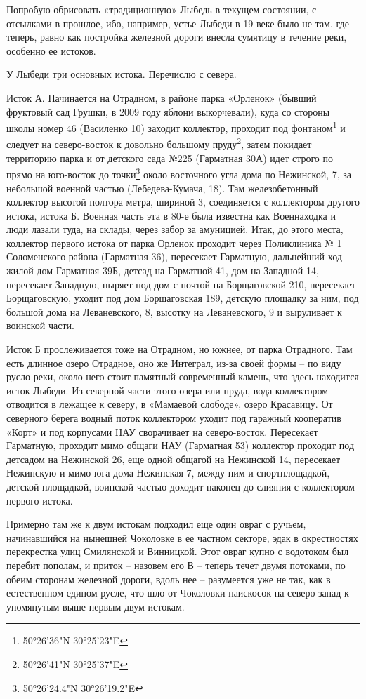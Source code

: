 Попробую обрисовать «традиционную» Лыбедь в текущем состоянии, с отсылками в прошлое, ибо, например, устье Лыбеди в 19 веке было не там, где теперь, равно как постройка железной дороги внесла сумятицу в течение реки, особенно ее истоков.

У Лыбеди три основных истока. Перечислю с севера.

Исток А. Начинается на Отрадном, в районе парка «Орленок» (бывший фруктовый сад Грушки, в 2009 году яблони выкорчевали), куда со стороны школы номер 46 (Василенко 10) заходит коллектор, проходит под фонтаном\footnote{50°26'36"N 30°25'23"E} и следует на северо-восток к довольно большому пруду\footnote{50°26'41"N 30°25'37"E}, затем покидает территорию парка и от детского сада №225 (Гарматная 30А) идет строго по прямо на юго-восток до точки\footnote{50°26'24.4"N 30°26'19.2"E} около восточного угла дома по Нежинской, 7, за небольшой военной частью (Лебедева-Кумача, 18). Там железобетонный коллектор высотой полтора метра, шириной 3, соединяется с коллектором другого истока, истока Б. Военная часть эта в 80-е была известна как Военнаходка и люди лазали туда, на склады, через забор за амуницией. Итак, до этого места, коллектор первого истока от парка Орленок проходит через Поликлиника № 1 Соломенского района (Гарматная 36), пересекает Гарматную, дальнейший ход – жилой дом Гарматная 39Б, детсад на Гарматной 41, дом на Западной 14, пересекает Западную, ныряет под дом с почтой на Борщаговской 210, пересекает Борщаговскую, уходит под дом Борщаговская 189, детскую площадку за ним, под большой дома на Леваневского, 8, высотку на Леваневского, 9 и выруливает к воинской части.  

Исток Б прослеживается тоже на Отрадном, но южнее, от парка Отрадного. Там есть длинное озеро Отрадное, оно же Интеграл, из-за своей формы – по виду русло реки, около него стоит памятный современный камень, что здесь находится исток Лыбеди. Из северной части этого озера или пруда, вода коллектором отводится в лежащее к северу, в «Мамаевой слободе», озеро Красавицу. От северного берега водный поток коллектором уходит под гаражный кооператив «Корт» и под корпусами НАУ сворачивает на северо-восток. Пересекает Гарматную, проходит мимо общаги НАУ (Гарматная 53) коллектор проходит под детсадом на Нежинской 26, еще одной общагой на Нежинской 14, пересекает Нежинскую и мимо юга дома Нежинская 7, между ним и спортплощадкой, детской площадкой, воинской частью доходит наконец до слияния с коллектором первого истока.

Примерно там же к двум истокам подходил еще один овраг с ручьем, начинавшийся на нынешней Чоколовке в ее частном секторе, эдак в окрестностях перекрестка улиц Смилянской и Винницкой. Этот овраг купно с водотоком был перебит пополам, и приток – назовем его В – теперь течет двумя потоками, по обеим сторонам железной дороги, вдоль нее – разумеется уже не так, как в естественном едином русле, что шло от Чоколовки наискосок на северо-запад к упомянутым выше первым двум истокам. 

